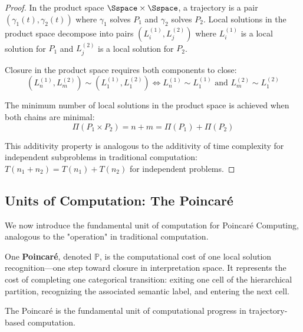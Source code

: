 \begin{proof}
In the product space $\Sspace \times \Sspace$, a trajectory is a pair $(\gamma_1(t), \gamma_2(t))$ where $\gamma_1$ solves $P_1$ and $\gamma_2$ solves $P_2$. Local solutions in the product space decompose into pairs $(L_i^{(1)}, L_j^{(2)})$ where $L_i^{(1)}$ is a local solution for $P_1$ and $L_j^{(2)}$ is a local solution for $P_2$.

Closure in the product space requires both components to close:
\begin{equation}
(L_n^{(1)}, L_m^{(2)}) \sim (L_1^{(1)}, L_1^{(2)}) \iff L_n^{(1)} \sim L_1^{(1)} \text{ and } L_m^{(2)} \sim L_1^{(2)}
\end{equation}

The minimum number of local solutions in the product space is achieved when both chains are minimal:
\begin{equation}
\Pi(P_1 \times P_2) = n + m = \Pi(P_1) + \Pi(P_2)
\end{equation}

This additivity property is analogous to the additivity of time complexity for independent subproblems in traditional computation: $T(n_1 + n_2) = T(n_1) + T(n_2)$ for independent problems.
\end{proof}

\subsection{Units of Computation: The Poincaré}

We now introduce the fundamental unit of computation for Poincaré Computing, analogous to the "operation" in traditional computation.

\begin{definition}
\label{def:poincare_unit}
One \textbf{Poincaré}, denoted $\mathbb{P}$, is the computational cost of one local solution recognition—one step toward closure in interpretation space. It represents the cost of completing one categorical transition: exiting one cell of the hierarchical partition, recognizing the associated semantic label, and entering the next cell.

The Poincaré is the fundamental unit of computational progress in trajectory-based computation.
\end{definition}

